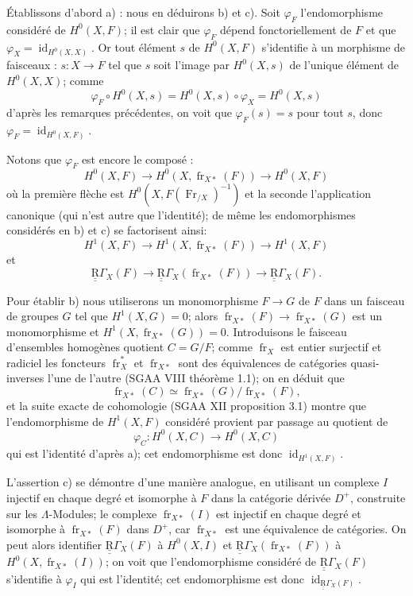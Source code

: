 \documentclass[11pt]{article}
\providecommand{\id}{\operatorname{id}}
\providecommand{\id}{\operatorname{id}}
\providecommand{\id}{\operatorname{id}}
\providecommand{\id}{\operatorname{id}}
\providecommand{\id}{\operatorname{id}}
\providecommand{\fr}{\operatorname{fr}}
\providecommand{\Fr}{\operatorname{Fr}}
\providecommand{\Fr}{\operatorname{Fr}}
\providecommand{\fr}{\operatorname{fr}}
\providecommand{\id}{\operatorname{id}}
\begin{document}
Établissons d'abord a) : nous en déduirons b) et c). Soit $\varphi_F$ l'endomorphisme considéré de $H^0(X,F)$; il est clair que $\varphi_F$ dépend fonctoriellement de $F$ et que $\varphi_X=\id_{H^0(X,X)}$. Or tout élément $s$ de $H^0(X,F)$ s'identifie à un morphisme de faisceaux : $s:X\to F$ tel que $s$ soit l'image par $H^0(X,s)$ de l'unique élément de $H^0(X,X)$; comme
\[
\varphi_F\circ H^0(X,s)=H^0(X,s)\circ\varphi_X=H^0(X,s)
\]
d'après les remarques précédentes, on voit que $\varphi_F(s)=s$ pour tout $s$, donc $\varphi_F=\id_{H^0(X,F)}$.

Notons que $\varphi_F$ est encore le composé :
\[
H^0(X,F)\longrightarrow H^0(X,\fr_{X*}(F))
\longrightarrow H^0(X,F)
\]
où la première flèche est $H^0(X,F(\Fr_{/X})^{-1})$ et la seconde l'application canonique (qui n'est autre que l'identité); de même les endomorphismes considérés en b) et c) se factorisent ainsi:
\[
H^1(X,F)\longrightarrow H^1(X,\fr_{X*}(F))
\longrightarrow H^1(X,F)
\]
et
\[
\underline{\underline{\mathrm{R}}}\Gamma_X(F)\longrightarrow \underline{\underline{\mathrm{R}}}\Gamma_X(\fr_{X*}(F))
\longrightarrow \underline{\underline{\mathrm{R}}}\Gamma_X(F).
\]

Pour établir b) nous utiliserons un monomorphisme $F\to G$ de $F$ dans un faisceau de groupes $G$ tel que $H^1(X,G)=0$; alors $\fr_{X*}(F)\to\fr_{X*}(G)$ est un monomorphisme et $H^1(X,\fr_{X*}(G))=0$. Introduisons le faisceau d'ensembles homogènes quotient $C=G/F$;
comme $\fr_X$ est entier surjectif et radiciel les foncteurs $\fr_X^*$ et $\fr_{X*}$ sont des équivalences de catégories quasi-inverses l'une de l'autre (SGAA VIII théorème 1.1); on en déduit que
\[
\fr_{X*}(C)\simeq\fr_{X*}(G)/\fr_{X*}(F),
\]
et la suite exacte de cohomologie (SGAA XII proposition 3.1) montre que l'endomorphisme de $H^1(X,F)$ considéré provient par passage au quotient de
\[
\varphi_C:H^0(X,C)\longrightarrow H^0(X,C)
\]
qui est l'identité d'après a); cet endomorphisme est donc $\id_{H^1(X,F)}$.

L'assertion c) se démontre d'une manière analogue, en utilisant un complexe $I$ injectif en chaque degré et isomorphe à $F$ dans la catégorie dérivée $D^+$, construite sur les $\Lambda$-Modules; le complexe $\fr_{X*}(I)$ est injectif en chaque degré et isomorphe à $\fr_{X*}(F)$ dans $D^+$, car $\fr_{X*}$ est une équivalence de catégories. On peut alors identifier $\underline{\underline{\mathrm{R}}}\Gamma_X(F)$ à $H^0(X,I)$ et $\underline{\underline{\mathrm{R}}}\Gamma_X(\fr_{X*}(F))$ à $H^0(X,\fr_{X*}(I))$; on voit que l'endomorphisme considéré de $\underline{\underline{\mathrm{R}}}\Gamma_X(F)$ s'identifie à $\varphi_I$ qui est l'identité; cet endomorphisme est donc $\id_{\underline{\underline{\mathrm{R}}}\Gamma_X(F)}$.
\end{document}
